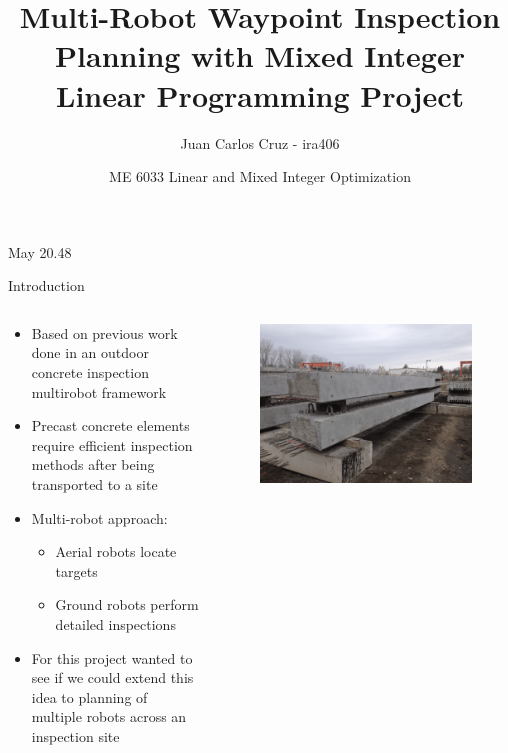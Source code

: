 \documentclass[aspectratio=169,11pt,xcolor={dvipsnames},hyperref={pdftex,pdfpagemode=UseNone,hidelinks,pdfdisplaydoctitle=true},usepdftitle=false]{beamer}
\title{Multi-Robot Waypoint Inspection Planning with Mixed Integer Linear Programming Project}
\author{Juan Carlos Cruz - ira406}
\date{ME 6033 Linear and Mixed Integer Optimization}
\begin{document}
    
    \begin{frame}
      \titlepage
      May 20.48
    \end{frame}
    
    \begin{frame}{Introduction}
      \begin{columns}[c]
        \begin{column}{0.48\textwidth}
          \begin{itemize}
            \item Based on previous work done in an outdoor concrete inspection multirobot framework
            \item Precast concrete elements require efficient inspection methods after being transported to a site
            \item Multi-robot approach:
              \begin{itemize}
                \item Aerial robots locate targets
                \item Ground robots perform detailed inspections
              \end{itemize}
            \item For this project wanted to see if we could extend this idea to planning of multiple robots across an inspection site
          \end{itemize}
          
        \end{column}

        \begin{column}{0.48\textwidth}

          \begin{figure}
            \centering
            \includegraphics[scale=0.35]{figures/concrete.pdf}
          \end{figure}
              
        \end{column}
      \end{columns}

    \end{frame}
\end{document}
